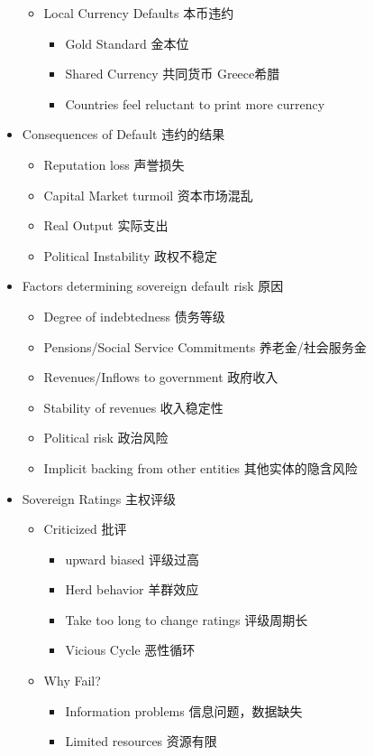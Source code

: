 \documentclass[a4paper,6pt,twoside,openany]{article}
\begin{document}
\begin{itemize}
\begin{itemize}
  \item Local Currency Defaults 本币违约
    \begin{itemize}
    \item Gold Standard 金本位
    \item Shared Currency 共同货币 Greece希腊
    \item Countries feel reluctant to print more currency
    \end{itemize}
  \end{itemize}
\item Consequences of Default 违约的结果
  \begin{itemize}
  \item Reputation loss 声誉损失
  \item Capital Market turmoil 资本市场混乱
  \item Real Output 实际支出
  \item Political Instability 政权不稳定
  \end{itemize}
\item Factors determining sovereign default risk 原因
  \begin{itemize}
  \item Degree of indebtedness 债务等级
  \item Pensions/Social Service Commitments  养老金/社会服务金
  \item Revenues/Inflows to government 政府收入
  \item Stability of revenues 收入稳定性
  \item Political risk 政治风险
  \item Implicit backing from other entities 其他实体的隐含风险
  \end{itemize}
\item Sovereign Ratings 主权评级
  \begin{itemize}
  \item Criticized 批评
    \begin{itemize}
    \item upward biased 评级过高
    \item Herd behavior 羊群效应
    \item Take too long to change ratings 评级周期长
    \item Vicious Cycle 恶性循环
    \end{itemize}
  \item Why Fail?
    \begin{itemize}
    \item Information problems 信息问题，数据缺失
    \item Limited resources 资源有限

\end{itemize}
\end{itemize}
\end{itemize}
\end{document}
